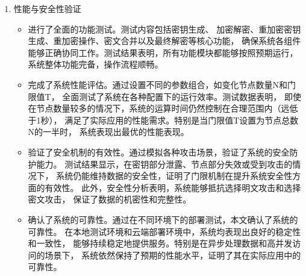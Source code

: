 \begin{enumerate}
\begin{itemize}
		      \item 采用国密算法确保系统安全性。相比国际通用的加密算法，
		            国密算法不仅具有同等的安全强度，还在国内具有更好的兼容性和符合性。
		            具体实现中，采用SM2椭圆曲线密码算法提供公钥加密功能，
		            SM3哈希算法用于数据完整性验证和密钥派生，SM4对称加密算法用于高效的数据加密。

		      \item 实现了高效的混合加密机制。
		            通过结合密钥封装机制（KEM）和数据封装机制（DEM），
		            系统能够在保证安全性的同时提高加密效率。具体而言，
		            使用SM4对称算法加密原始数据，再使用SM2公钥算法加密SM4的会话密钥，
		            这种混合加密方式显著提高了系统处理大量数据时的性能。

		      \item 设计了灵活的密钥管理方案。通过分布式的密钥生成和管理机制，
		            系统能够灵活应对不同的应用场景需求。数据拥有方可以根据安全需要，
		            动态调整门限值和代理节点数量，实现对授权访问的精细控制。
		            同时，重加密密钥的分片管理确保了即使部分代理节点被攻破，
		            整个系统的安全性仍然能够得到保障。
	      \end{itemize}

	\item 性能与安全性验证
	      \begin{itemize}
		      \item 进行了全面的功能测试。测试内容包括密钥生成、
		            加密解密、重加密密钥生成、重加密操作、密文合并以及最终解密等核心功能，
		            确保系统各组件能够正确协同工作。测试结果表明，所有功能模块都能够按照预期运行，
		            系统整体功能完备，操作流程顺畅。

		      \item 完成了系统性能评估。通过设置不同的参数组合，如变化节点数量N和门限值T，
		            全面测试了系统在各种配置下的运行效率。测试数据表明，
		            即使在节点数量较多的情况下，系统的运算时间仍然控制在合理范围内（远低于1秒），
		            满足了实际应用的性能需求。特别是当门限值T设置为节点总数N的一半时，
		            系统表现出最优的性能表现。

		      \item 验证了安全机制的有效性。通过模拟各种攻击场景，验证了系统的安全防护能力。
		            测试结果显示，在密钥部分泄露、节点部分失效或受到攻击的情况下，
		            系统仍能维持数据的安全性，证明了门限机制在提升系统安全性方面的有效性。
		            此外，安全性分析表明，系统能够抵抗选择明文攻击和选择密文攻击，
		            保证了数据的机密性和完整性。

		      \item 确认了系统的可靠性。通过在不同环境下的部署测试，本文确认了系统的可靠性。
		            在本地测试环境和云端部署环境中，系统均表现出良好的稳定性和一致性，
		            能够持续稳定地提供服务。特别是在异步处理数据和高并发访问的场景下，
		            系统依然保持了预期的性能水平，证明了其在实际应用中的可靠性。
	      \end{itemize}
\end{enumerate}

